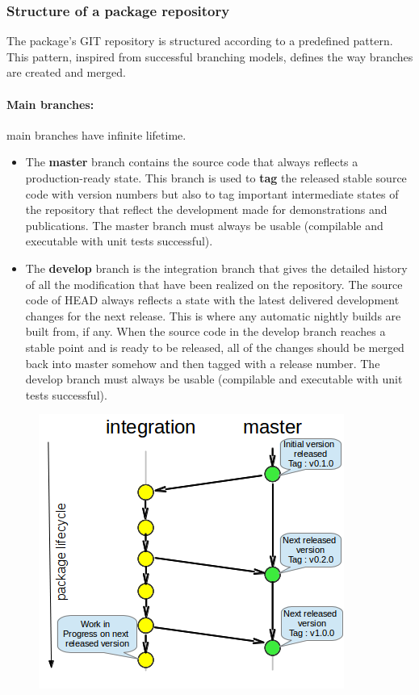 \documentclass[12pt,a4paper]{article}
\begin{document}
\subsubsection{Structure of a package repository}

The package's GIT repository is structured according to a predefined pattern. This pattern, inspired from successful branching models, defines the way branches are created and merged. 

\paragraph{Main branches:} main branches have infinite lifetime.
\begin{itemize}
\item The \textbf{master} branch contains the source code that always reflects a production-ready state. This branch is used to \textbf{tag} the released stable source code with version numbers but also to tag important intermediate states of the repository that reflect the development made for demonstrations and publications. The master branch must always be usable (compilable and executable with unit tests successful).
\item The \textbf{develop} branch is the integration branch that gives the detailed history of all the modification that have been realized on the repository. The source code of HEAD always reflects a state with the latest delivered development changes for the next release. This is where any automatic nightly builds are built from, if any. When the source code in the develop branch reaches a stable point and is ready to be released, all of the changes should be merged back into master somehow and then tagged with a release number. The develop branch must always be usable (compilable and executable with unit tests successful).
\end{itemize}

\begin{figure}
\center
\includegraphics[scale=0.7]{images/permanent_branches.png}
\end{figure}
 
\end{document}
